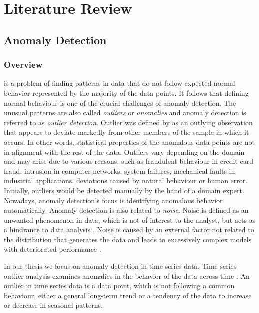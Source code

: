 \chapter{Literature Review}

\section{Anomaly Detection}
\subsection{Overview}

 is a problem of finding patterns in data that do not follow expected normal behavior represented by the majority of the data points. It follows that defining normal behaviour is one of the crucial challenges of anomaly detection. The unusual patterns are also called \textit{outliers} or \textit{anomalies} and anomaly detection is referred to as \textit{outlier detection}. Outlier was defined by \cite{ORD1996175} as an outlying observation that appears to deviate markedly from other members of the sample in which it occurs. In other words, statistical properties of the anomalous data points are not in alignment with the rest of the data. Outliers vary depending on the domain and may arise due to various reasons, such as fraudulent behaviour in credit card fraud, intrusion in computer networks, system failures, mechanical faults in industrial applications, deviations caused by natural behaviour or human error. Initially, outliers would be detected manually by the hand of a domain expert. Nowadays, anomaly detection's focus is identifying anomalous behavior automatically. Anomaly detection is also related to \textit{noise}. Noise is defined as an unwanted phenomenon in data, which is not of interest to the analyst, but acts as a hindrance to data analysis \cite{cvbakv2009}. Noise is  caused by an external factor not related to the distribution that generates the data \cite{ggh2017} and leads to excessively complex models with deteriorated performance \cite{wu2007}. 

In our thesis we focus on anomaly detection in time series data. Time series outlier analysis examines anomalies in the behavior of the data across time \cite{gupta2014}. An outlier in time series data is a data point, which is not following a common behaviour, either a general long-term trend or a tendency of the data to increase or decrease in seasonal patterns. 

